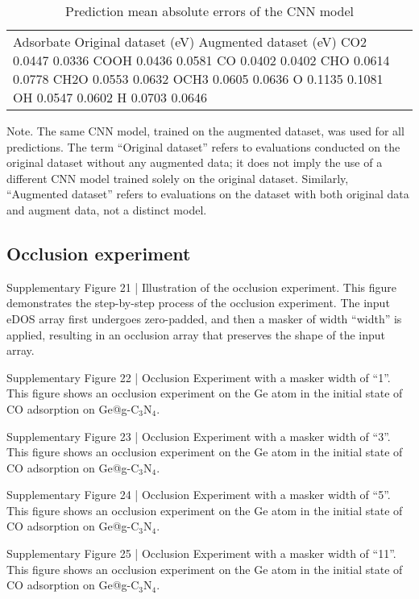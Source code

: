 \begin{table}[h]
    \centering
    \begin{tabular}{lr}
      \hline
      Adsorbate	Original dataset (eV)	Augmented dataset (eV)
      \hline
      CO2	0.0447	0.0336
      COOH	0.0436	0.0581
      CO	0.0402	0.0402
      CHO	0.0614	0.0778
      CH2O	0.0553	0.0632
      OCH3	0.0605	0.0636
      O	0.1135	0.1081
      OH	0.0547	0.0602
      H	0.0703	0.0646
      \hline
    \end{tabular}
    \caption{Prediction mean absolute errors of the CNN model}
    \label{si_table18}
\end{table}
Note. The same CNN model, trained on the augmented dataset, was used for all predictions. The term “Original dataset” refers to evaluations conducted on the original dataset without any augmented data; it does not imply the use of a different CNN model trained solely on the original dataset. Similarly, “Augmented dataset” refers to evaluations on the dataset with both original data and augment data, not a distinct model.

\subsection{Occlusion experiment}

Supplementary Figure 21 | Illustration of the occlusion experiment. This figure demonstrates the step-by-step process of the occlusion experiment. The input eDOS array first undergoes zero-padded, and then a masker of width “width” is applied, resulting in an occlusion array that preserves the shape of the input array.


Supplementary Figure 22 | Occlusion Experiment with a masker width of “1”. This figure shows an occlusion experiment on the Ge atom in the initial state of CO adsorption on Ge@g-C$_3$N$_4$.


Supplementary Figure 23 | Occlusion Experiment with a masker width of “3”. This figure shows an occlusion experiment on the Ge atom in the initial state of CO adsorption on Ge@g-C$_3$N$_4$.


Supplementary Figure 24 | Occlusion Experiment with a masker width of “5”. This figure shows an occlusion experiment on the Ge atom in the initial state of CO adsorption on Ge@g-C$_3$N$_4$.

Supplementary Figure 25 | Occlusion Experiment with a masker width of “11”. This figure shows an occlusion experiment on the Ge atom in the initial state of CO adsorption on Ge@g-C$_3$N$_4$.


